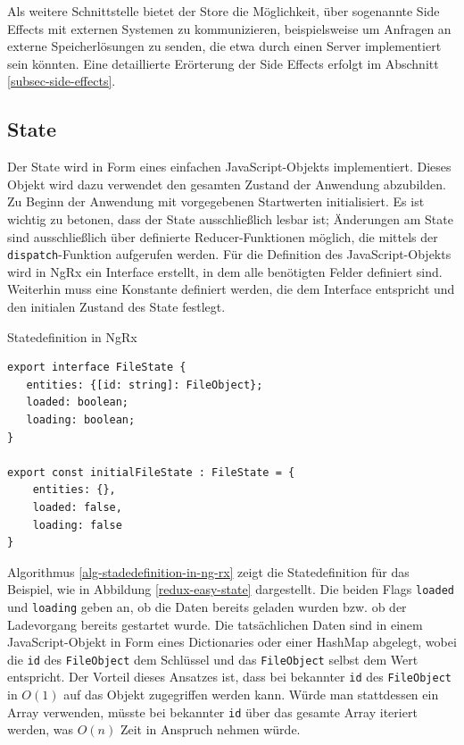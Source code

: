\documentclass[12pt]{book}          %
\begin{document}
 Als weitere Schnittstelle bietet der Store die Möglichkeit, über sogenannte Side Effects mit externen Systemen zu kommunizieren, beispielsweise um Anfragen an externe Speicherlösungen zu senden, die etwa durch einen Server implementiert sein könnten. Eine detaillierte Erörterung der Side Effects erfolgt im Abschnitt \ref{subsec-side-effects}.

\subsection{State}
\label{subsec-state}


Der State wird in Form eines einfachen JavaScript-Objekts implementiert. Dieses Objekt wird dazu verwendet den gesamten Zustand der Anwendung abzubilden. Zu Beginn der Anwendung mit vorgegebenen Startwerten initialisiert. Es ist wichtig zu betonen, dass der State ausschließlich lesbar ist; Änderungen am State sind ausschließlich über definierte Reducer-Funktionen möglich, die mittels der \texttt{dispatch}-Funktion aufgerufen werden. Für die Definition des JavaScript-Objekts wird in NgRx ein Interface erstellt, in dem alle benötigten Felder definiert sind. Weiterhin muss eine Konstante definiert werden, die dem Interface entspricht und den initialen Zustand des State festlegt.

\begin{algorithm}
\caption{Statedefinition in NgRx}
\label{alg-stadedefinition-in-ng-rx}
\begin{lstlisting}
export interface FileState {
   entities: {[id: string]: FileObject};
   loaded: boolean;
   loading: boolean;
}

export const initialFileState : FileState = {
    entities: {},
    loaded: false,
    loading: false
}
\end{lstlisting}
\end{algorithm}

Algorithmus \ref{alg-stadedefinition-in-ng-rx} zeigt die Statedefinition für das Beispiel, wie in Abbildung \ref{redux-easy-state} dargestellt. Die beiden Flags \texttt{loaded} und \texttt{loading} geben an, ob die Daten bereits geladen wurden bzw. ob der Ladevorgang bereits gestartet wurde. Die tatsächlichen Daten sind in einem JavaScript-Objekt in Form eines Dictionaries oder einer HashMap abgelegt, wobei die \texttt{id} des \texttt{FileObject} dem Schlüssel und das \texttt{FileObject} selbst dem Wert entspricht. Der Vorteil dieses Ansatzes ist, dass bei bekannter \texttt{id} des \texttt{FileObject} in $O(1)$ auf das Objekt zugegriffen werden kann. Würde man stattdessen ein Array verwenden, müsste bei bekannter \texttt{id} über das gesamte Array iteriert werden, was $O(n)$ Zeit in Anspruch nehmen würde. \cite[54]{bae_javascript_2019}
\end{document}

